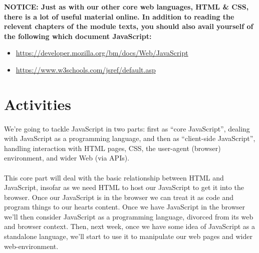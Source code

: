 \documentclass[10pt, a4paper, twosize]{article}
\begin{document}
\begin{framed}
{\bf{NOTICE:} Just as with our other core web languages, HTML \& CSS, there is a lot of useful material online. In addition to reading the relevent chapters of the module texts, you should also avail yourself of the following which document JavaScript:
\begin{itemize}
\item \url{https://developer.mozilla.org/bm/docs/Web/JavaScript}
\item \url{https://www.w3schools.com/jsref/default.asp}
\end{itemize}
  }
\end{framed}


\section{Activities}
\paragraph{} We're going to tackle JavaScript in two parts: first as ``core JavaScript'', dealing with JavaScript as a programming language, and then as ``client-side JavaScript'', handling interaction with HTML pages, CSS, the user-agent (browser) environment, and wider Web (via APIs).

\paragraph{} This core part will deal with the basic relationship between HTML and JavaScript, insofar as we need HTML to host our JavaScript to get it into the browser. Once our JavaScript is in the browser we can treat it as code and program things to our hearts content. Once we have JavaScript in the browser we'll then consider JavaScript as a programming language, divorced from its web and browser context. Then, next week, once we have some idea of JavaScript as a standalone language, we'll start to use it to manipulate our web pages and wider web-environment. 
\end{document}
